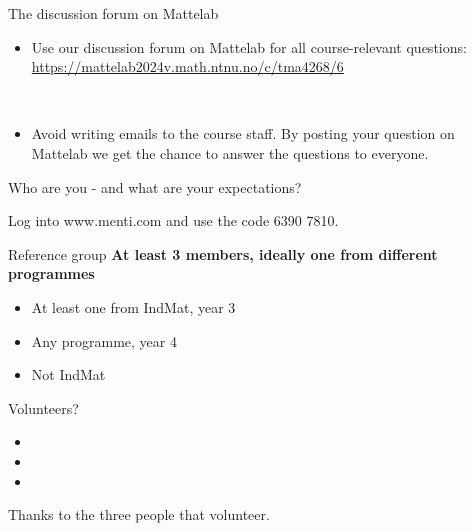 \documentclass[
  10pt,
  ignorenonframetext,
]{beamer}
\providecommand{\tightlist}{%
  \setlength{\itemsep}{0pt}\setlength{\parskip}{0pt}}
\begin{document}
\begin{frame}
\begin{block}{The discussion forum on Mattelab}
\protect\hypertarget{the-discussion-forum-on-mattelab}{}
\(~\)

\begin{itemize}
\tightlist
\item
  Use our discussion forum on Mattelab for all course-relevant
  questions: \url{https://mattelab2024v.math.ntnu.no/c/tma4268/6}
\end{itemize}

\(~\)

\begin{itemize}
\tightlist
\item
  Avoid writing emails to the course staff. By posting your question on
  Mattelab we get the chance to answer the questions to everyone.
\end{itemize}
\end{block}
\end{frame}

\begin{frame}{Who are you - and what are your expectations?}
\protect\hypertarget{who-are-you---and-what-are-your-expectations}{}
\(~\)

Log into www.menti.com and use the code 6390 7810.
\end{frame}

\begin{frame}{Reference group}
\protect\hypertarget{reference-group}{}
\textbf{At least 3 members, ideally one from different programmes}

\begin{itemize}
\tightlist
\item
  At least one from IndMat, year 3
\item
  Any programme, year 4
\item
  Not IndMat
\end{itemize}

Volunteers?

\begin{itemize}
\tightlist
\item
\item
\item
\end{itemize}

Thanks to the three people that volunteer.
\end{frame}
\end{document}
